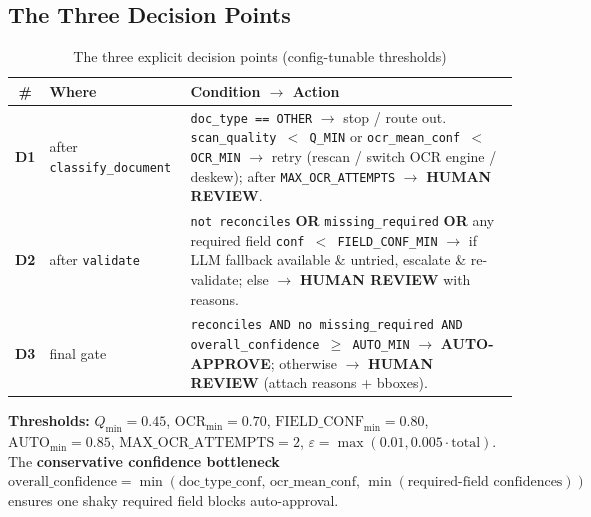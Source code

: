 \documentclass[12pt,a4paper]{article}
\begin{document}
\subsection{The Three Decision Points}

\begin{table}[H]
\centering
\caption{The three explicit decision points (config-tunable thresholds)}
\small
\begin{tabularx}{\linewidth}{@{} c l L @{}}
\toprule
\textbf{\#} & \textbf{Where} & \textbf{Condition $\to$ Action} \\
\midrule
\textbf{D1} & after \texttt{classify\_document} & \texttt{doc\_type == OTHER} $\to$ stop / route out. \newline \texttt{scan\_quality $<$ Q\_MIN} or \texttt{ocr\_mean\_conf $<$ OCR\_MIN} $\to$ retry (rescan / switch OCR engine / deskew); after \texttt{MAX\_OCR\_ATTEMPTS} $\to$ \textbf{HUMAN REVIEW}. \\
\addlinespace
\textbf{D2} & after \texttt{validate} & \texttt{not reconciles} \textbf{OR} \texttt{missing\_required} \textbf{OR} any required field \texttt{conf $<$ FIELD\_CONF\_MIN} $\to$ if LLM fallback available \& untried, escalate \& re-validate; else $\to$ \textbf{HUMAN REVIEW} with reasons. \\
\addlinespace
\textbf{D3} & final gate & \texttt{reconciles AND no missing\_required AND overall\_confidence $\geq$ AUTO\_MIN} $\to$ \textbf{AUTO-APPROVE}; otherwise $\to$ \textbf{HUMAN REVIEW} (attach reasons + bboxes). \\
\bottomrule
\end{tabularx}
\end{table}

\noindent\textbf{Thresholds:} $Q_{\min}=0.45$, $\text{OCR}_{\min}=0.70$,
$\text{FIELD\_CONF}_{\min}=0.80$, $\text{AUTO}_{\min}=0.85$,
$\text{MAX\_OCR\_ATTEMPTS}=2$, $\varepsilon=\max(0.01,0.005\cdot\text{total})$. The
\textbf{conservative confidence bottleneck}
$\text{overall\_confidence} = \min(\text{doc\_type\_conf},\,\text{ocr\_mean\_conf},\,\min(\text{required-field confidences}))$
ensures one shaky required field blocks auto-approval.
\end{document}
